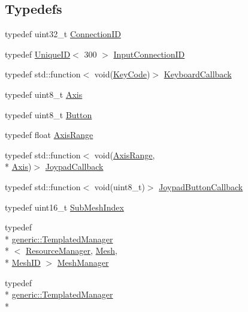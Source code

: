 \subsection*{Typedefs}
\begin{DoxyCompactItemize}
\item 
typedef uint32\-\_\-t \hyperlink{namespacekglt_af34ceb611710ae87f8b3a6099eb1e66e}{Connection\-I\-D}
\item 
typedef \hyperlink{class_unique_i_d}{Unique\-I\-D}$<$ 300 $>$ \hyperlink{namespacekglt_a8caf8fb4921e53068cbd719f2652a52e}{Input\-Connection\-I\-D}
\item 
typedef std\-::function$<$ void(\hyperlink{namespacekglt_ad735ac41d7b9c4aa1dc99343bc0f42b3}{Key\-Code})$>$ \hyperlink{namespacekglt_ae7d41ce25070124da5ac2997c7a3ebe7}{Keyboard\-Callback}
\item 
typedef uint8\-\_\-t \hyperlink{namespacekglt_aacdc540f5eb3041498aaff3012a9a9ec}{Axis}
\item 
typedef uint8\-\_\-t \hyperlink{namespacekglt_a3a2475e3cbfe8d5c5bf855448b8a91dd}{Button}
\item 
typedef float \hyperlink{namespacekglt_a191e1834d9739a151c5083c08fce8938}{Axis\-Range}
\item 
typedef std\-::function$<$ void(\hyperlink{namespacekglt_a191e1834d9739a151c5083c08fce8938}{Axis\-Range}, \\*
\hyperlink{namespacekglt_aacdc540f5eb3041498aaff3012a9a9ec}{Axis})$>$ \hyperlink{namespacekglt_aa8de4aa3c6cd3469d4032a4a04761eb6}{Joypad\-Callback}
\item 
typedef std\-::function$<$ void(uint8\-\_\-t)$>$ \hyperlink{namespacekglt_a020048fdd1dc93e7e1d1b23662df4d4d}{Joypad\-Button\-Callback}
\item 
typedef uint16\-\_\-t \hyperlink{namespacekglt_aa750d1bb3b7a0d679b32c96fed625213}{Sub\-Mesh\-Index}
\item 
typedef \\*
\hyperlink{classkglt_1_1generic_1_1_templated_manager}{generic\-::\-Templated\-Manager}\\*
$<$ \hyperlink{classkglt_1_1_resource_manager}{Resource\-Manager}, \hyperlink{classkglt_1_1_mesh}{Mesh}, \\*
\hyperlink{namespacekglt_a525b047f668a129a0b102be7f2fe32be}{Mesh\-I\-D} $>$ \hyperlink{namespacekglt_a7fe8401d2c2b7af53d42e91809cf3042}{Mesh\-Manager}
\item 
typedef \\*
\hyperlink{classkglt_1_1generic_1_1_templated_manager}{generic\-::\-Templated\-Manager}\\*

\end{DoxyCompactItemize}
